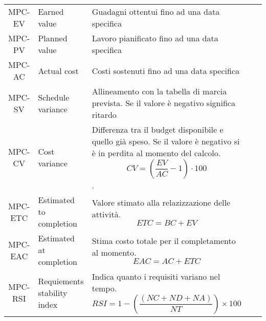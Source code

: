 \begin{table}[H]
\begin{tabular}{| c | p{4.2cm} | p{5cm} |c |  c  }
        MPC-EV                                                         & Earned value                & Guadagni ottentui fino ad una data specifica                                                                                                                                                        \\
        MPC-PV                                                         & Planned value               & Lavoro pianificato fino ad una data specifica                                                                                                                                                       \\
        MPC-AC                                                         & Actual cost                 & Costi sostenuti fino ad una data specifica                                                                                                                                                          \\
        MPC-SV                                                         & Schedule variance           & Allineamento con la tabella di marcia prevista. Se il valore è negativo significa ritardo                                                                                                           \\
        MPC-CV                                                         & Cost variance               & Differenza tra il budget disponibile e quello già speso. Se il valore è negativo si è in perdita al momento del calcolo. \begin{equation}CV = \left(\frac{EV}{AC} -1\right)\cdot100 \end{equation}. \\
        MPC-ETC                                                        & Estimated to completion     & Valore stimato alla relazizzazione delle attività.\begin{equation} ETC = BC + EV \end{equation}                                                                                                     \\
        MPC-EAC                                                        & Estimated at completion     & Stima costo totale per il completamento al momento. \begin{equation} EAC = AC + ETC \end{equation}                                                                                                  \\
        MPC-RSI                                                        & Requiements stability index & Indica quanto i requisiti variano nel tempo. \begin{equation}RSI = 1- \left( \frac{(NC + ND + NA)}{NT} \right) \times 100\end{equation}                                                                \\

        \hline
    \end{tabular}
\end{table}
